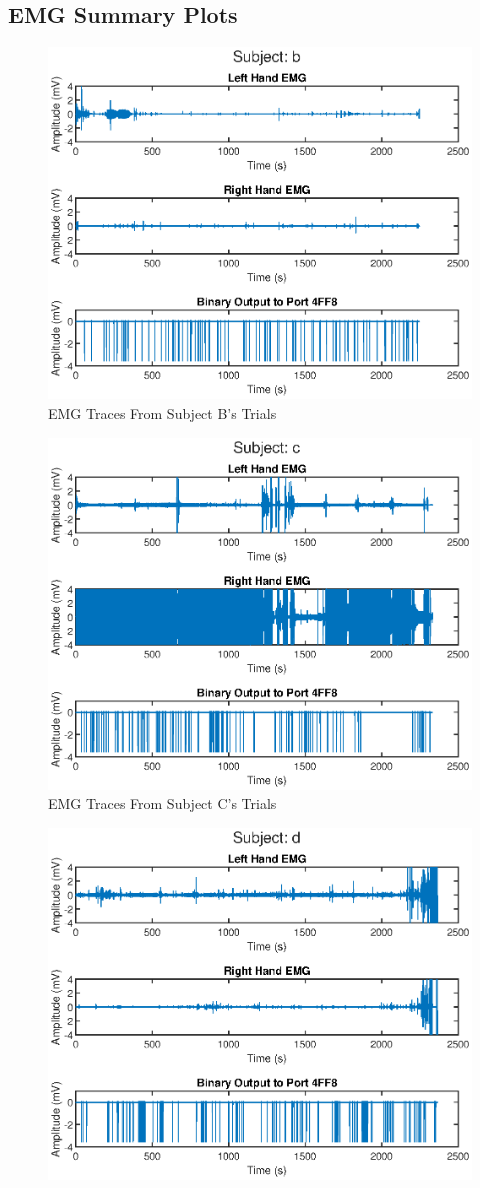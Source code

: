 \begin{appendices}
\section{EMG Summary Plots}
\label{appendix:ExtraResults1_1}
\begin{figure}[H]
    \centering
    \includegraphics[width=0.75\linewidth]{figures/EMG_summary_b.eps}
    \caption{EMG Traces From Subject B's Trials}
    \label{fig:EMG_Sum_B}
\end{figure}
\begin{figure}[H]
    \centering
    \includegraphics[width=0.75\linewidth]{figures/EMG_summary_c.eps}
    \caption{EMG Traces From Subject C's Trials}
    \label{fig:EMG_Sum_C}
\end{figure}
\begin{figure}[H]
    \centering
    \includegraphics[width=0.75\linewidth]{figures/EMG_summary_d.eps}

\end{figure}
\end{appendices}
